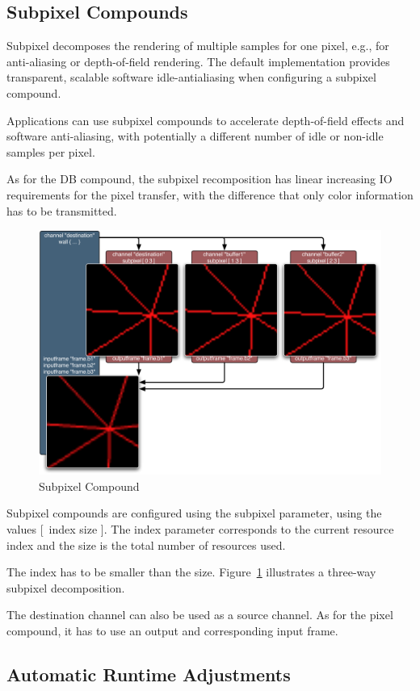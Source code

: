\documentclass[10pt,a4]{scrartcl}
\newcommand{\fig}[1]{Figure~\ref{#1}}
\begin{document}
\subsection{\label{sSubpixel}Subpixel Compounds}

Subpixel decomposes the rendering of multiple samples for one pixel, e.g., for
anti-aliasing or depth-of-field rendering. The default implementation provides
transparent, scalable software idle-antialiasing when configuring a subpixel
compound.

Applications can use subpixel compounds to accelerate depth-of-field effects and
software anti-aliasing, with potentially a different number of idle or non-idle
samples per pixel.

As for the DB compound, the subpixel recomposition has linear increasing 
IO requirements for the pixel transfer, with the difference that only 
color information has to be transmitted.

\begin{figure}
  \includegraphics[width=.618\textwidth]{images/Subpixel.pdf}
  {\caption{\label{fSubpixel}Subpixel Compound}}
\end{figure}
Subpixel compounds are configured using the \textsf{subpixel} parameter, using
the values \textsf{[~index size ]}. The \textsf{index} parameter corresponds to
the current resource index and the \textsf{size} is the total number of
resources used.

The \textsf{index} has to be smaller than the \textsf{size}. 
\fig{fSubpixel} illustrates a three-way subpixel decomposition.

The destination channel can also be used as a source channel. 
As for the pixel compound, it has to use an output and corresponding 
input frame.


\subsection{\label{sLoadBalancing}Automatic Runtime Adjustments}
\end{document}
